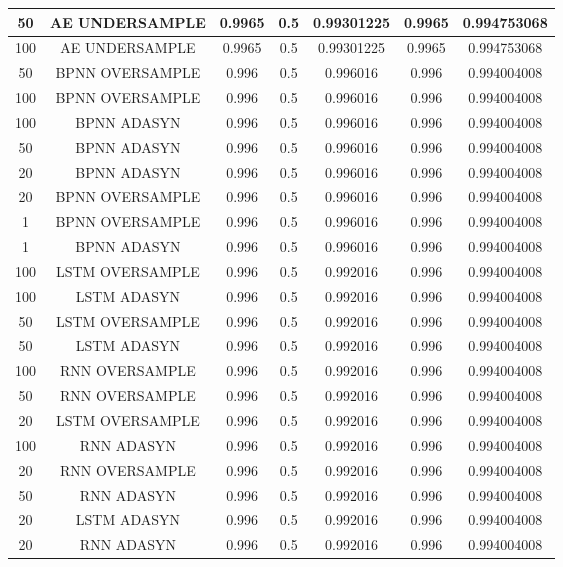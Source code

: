 \begin{longtable}{|c|c|c|c|c|c|c|}
  	50 & AE UNDERSAMPLE & 0.9965 & 0.5 & 0.99301225 & 0.9965 & 0.994753068\\ \hline
  	100 & AE UNDERSAMPLE & 0.9965 & 0.5 & 0.99301225 & 0.9965 & 0.994753068\\ \hline
  	50 & BPNN OVERSAMPLE & 0.996 & 0.5 & 0.996016 & 0.996 & 0.994004008\\ \hline
  	100 & BPNN OVERSAMPLE & 0.996 & 0.5 & 0.996016 & 0.996 & 0.994004008\\ \hline
  	100 & BPNN ADASYN & 0.996 & 0.5 & 0.996016 & 0.996 & 0.994004008\\ \hline
  	50 & BPNN ADASYN & 0.996 & 0.5 & 0.996016 & 0.996 & 0.994004008\\ \hline
  	20 & BPNN ADASYN & 0.996 & 0.5 & 0.996016 & 0.996 & 0.994004008\\ \hline
  	20 & BPNN OVERSAMPLE & 0.996 & 0.5 & 0.996016 & 0.996 & 0.994004008\\ \hline
  	1 & BPNN OVERSAMPLE & 0.996 & 0.5 & 0.996016 & 0.996 & 0.994004008\\ \hline
  	1 & BPNN ADASYN & 0.996 & 0.5 & 0.996016 & 0.996 & 0.994004008\\ \hline
  	100 & LSTM OVERSAMPLE & 0.996 & 0.5 & 0.992016 & 0.996 & 0.994004008\\ \hline
  	100 & LSTM ADASYN & 0.996 & 0.5 & 0.992016 & 0.996 & 0.994004008\\ \hline
  	50 & LSTM OVERSAMPLE & 0.996 & 0.5 & 0.992016 & 0.996 & 0.994004008\\ \hline
  	50 & LSTM ADASYN & 0.996 & 0.5 & 0.992016 & 0.996 & 0.994004008\\ \hline
  	100 & RNN OVERSAMPLE & 0.996 & 0.5 & 0.992016 & 0.996 & 0.994004008\\ \hline
  	50 & RNN OVERSAMPLE & 0.996 & 0.5 & 0.992016 & 0.996 & 0.994004008\\ \hline
  	20 & LSTM OVERSAMPLE & 0.996 & 0.5 & 0.992016 & 0.996 & 0.994004008\\ \hline
  	100 & RNN ADASYN & 0.996 & 0.5 & 0.992016 & 0.996 & 0.994004008\\ \hline
  	20 & RNN OVERSAMPLE & 0.996 & 0.5 & 0.992016 & 0.996 & 0.994004008\\ \hline
  	50 & RNN ADASYN & 0.996 & 0.5 & 0.992016 & 0.996 & 0.994004008\\ \hline
  	20 & LSTM ADASYN & 0.996 & 0.5 & 0.992016 & 0.996 & 0.994004008\\ \hline
  	20 & RNN ADASYN & 0.996 & 0.5 & 0.992016 & 0.996 & 0.994004008\\ \hline

\end{longtable}

